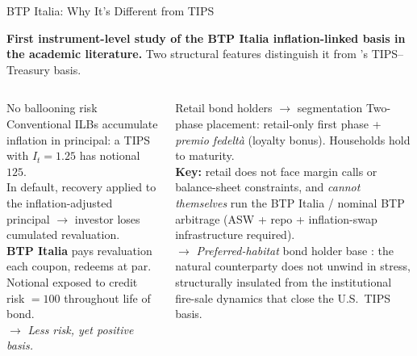 \documentclass[aspectratio=169,11pt]{beamer}
\begin{document}
\begin{frame}[t]{BTP Italia: Why It's Different from TIPS}
\footnotesize
\vspace{0.10cm}

\textbf{First instrument-level study of the BTP Italia inflation-linked basis in the academic literature.}
Two structural features distinguish it from \citet{fleckenstein2014tips}'s TIPS--Treasury basis.

\vspace{0.30cm}

\begin{columns}[t]
\begin{exampleblock}{No ballooning risk}
\scriptsize
Conventional ILBs accumulate inflation in principal: a TIPS with $I_t=1.25$ has notional $125$. \\[4pt]
In default, recovery applied to the inflation-adjusted principal $\rightarrow$ investor loses cumulated revaluation. \\[4pt]
\textbf{BTP Italia} pays revaluation each coupon, redeems at par. Notional exposed to credit risk $= 100$ throughout life of bond. \\[4pt]
$\rightarrow$ \emph{Less risk, yet positive basis.}
\end{exampleblock}

\begin{exampleblock}{Retail bond holders $\rightarrow$ segmentation}
\scriptsize
Two-phase placement: retail-only first phase + \textit{premio fedelt\`a} (loyalty bonus). Households hold to maturity. \\[4pt]
\textcolor{myred}{\textbf{Key:}} retail does not face margin calls or balance-sheet constraints, and \emph{cannot themselves} run the BTP Italia / nominal BTP arbitrage (ASW + repo + inflation-swap infrastructure required). \\[4pt]
$\rightarrow$ \emph{Preferred-habitat} bond holder base \citep{vayanos2021preferred}: the natural counterparty does not unwind in stress, structurally insulated from the institutional fire-sale dynamics that close the U.S.\ TIPS basis.
\end{exampleblock}
\end{columns}

\end{frame}
\end{document}

